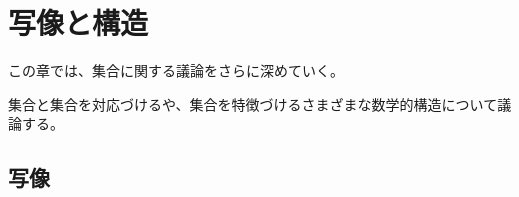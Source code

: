 \documentclass[../imaging-math]{subfiles}
\begin{document}
\chapter{写像と構造}

この章では、集合に関する議論をさらに深めていく。

集合と集合を対応づけるや、集合を特徴づけるさまざまな数学的構造について議論する。

\section{写像}

\wip
\end{document}
